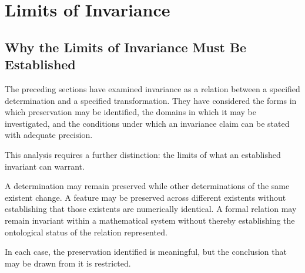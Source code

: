 %
%
%
%
%

\section{Limits of Invariance}
\label{sec:limits-of-invariance}

\subsection{Why the Limits of Invariance Must Be Established}

The preceding sections have examined invariance as a relation
between a specified determination and a specified transformation.
They have considered the forms in which preservation may be
identified, the domains in which it may be investigated, and
the conditions under which an invariance claim can be stated
with adequate precision.

This analysis requires a further distinction: the limits of
what an established invariant can warrant.

A determination may remain preserved while other determinations
of the same existent change. A feature may be preserved across
different existents without establishing that those existents
are numerically identical. A formal relation may remain invariant
within a mathematical system without thereby establishing the
ontological status of the relation represented.

In each case, the preservation identified is meaningful, but
the conclusion that may be drawn from it is restricted.

